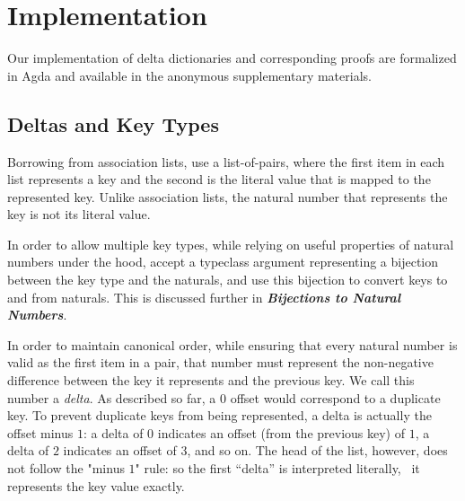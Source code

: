\section{Implementation}
\label{sec:DD}



Our implementation of delta dictionaries and corresponding proofs are formalized in Agda and available in the anonymous supplementary materials.

\subsection{Deltas and Key Types}

Borrowing from association lists, \dds{} use a list-of-pairs, where the first item in each list represents a key and the second is the literal value that is mapped to the represented key.
%
Unlike association lists, the natural number that represents the key is not its literal value.

In order to allow multiple key types, while relying on useful properties of natural numbers under the hood, \dds{} accept a typeclass argument representing a bijection
%
between the key type and the naturals, and use this bijection to convert keys to and from naturals. This is discussed further in \emph{\textbf{Bijections to Natural Numbers}}.

In order to maintain canonical order, while ensuring that every natural number is valid as the first item in a pair, that number must represent the non-negative difference between the key it represents and the previous key.
%
We call this number a \emph{delta}. %
%
As described so far, a $0$ offset would correspond to a duplicate key.
%
To prevent duplicate keys from being represented, a delta is actually the offset minus $1$: a delta of $0$ indicates an offset (from the previous key) of $1$, a delta of $2$ indicates an offset of $3$, and so on.
%
The head of the list, however, does not follow the "minus $1$" rule: so the first ``delta'' is interpreted literally, \ie{}~it represents the key value exactly.

